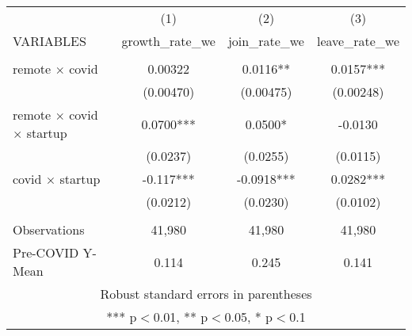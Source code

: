 \begin{tabular}{lccc} \hline
 & (1) & (2) & (3) \\
VARIABLES & growth\_rate\_we & join\_rate\_we & leave\_rate\_we \\ \hline
 &  &  &  \\
remote $\times$ covid & 0.00322 & 0.0116** & 0.0157*** \\
 & (0.00470) & (0.00475) & (0.00248) \\
remote $\times$ covid $\times$ startup & 0.0700*** & 0.0500* & -0.0130 \\
 & (0.0237) & (0.0255) & (0.0115) \\
covid $\times$ startup & -0.117*** & -0.0918*** & 0.0282*** \\
 & (0.0212) & (0.0230) & (0.0102) \\
 &  &  &  \\
Observations & 41,980 & 41,980 & 41,980 \\
 Pre-COVID Y-Mean & 0.114 & 0.245 & 0.141 \\ \hline
\multicolumn{4}{c}{ Robust standard errors in parentheses} \\
\multicolumn{4}{c}{ *** p$<$0.01, ** p$<$0.05, * p$<$0.1} \\
\end{tabular}
